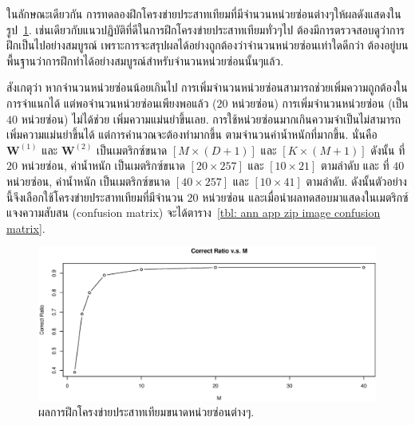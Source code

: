 ในลักษณะเดียวกัน การทดลองฝึกโครงข่ายประสาทเทียมที่มีจำนวนหน่วยซ่อนต่างๆให้ผลดังแสดงในรูป~\ref{fig: ann zip multiple Ms}.
เช่นเดียวกับแนวปฏิบัติที่ดีในการฝึกโครงข่ายประสาทเทียมทั่วๆไป ต้องมีการตรวจสอบดูว่าการฝึกเป็นไปอย่างสมบูรณ์ 
เพราะการจะสรุปผลได้อย่างถูกต้องว่าจำนวนหน่วยซ่อนเท่าใดดีกว่า 
ต้องอยู่บนพื้นฐานว่าการฝึกทำได้อย่างสมบูรณ์สำหรับจำนวนหน่วยซ่อนนั้นๆแล้ว.

สังเกตุว่า หากจำนวนหน่วยซ่อนน้อยเกินไป การเพิ่มจำนวนหน่วยซ่อนสามารถช่วยเพิ่มความถูกต้องในการจำแนกได้ แต่พอจำนวนหน่วยซ่อนเพียงพอแล้ว ($20$ หน่วยซ่อน) การเพิ่มจำนวนหน่วยซ่อน (เป็น $40$ หน่วยซ่อน) ไม่ได้ช่วย เพิ่มความแม่นยำขึ้นเลย.
การใช้หน่วยซ่อนมากเกินความจำเป็นไม่สามารถเพิ่มความแม่นยำขึ้นได้ แต่การคำนวณจะต้องทำมากขึ้น ตามจำนวนค่าน้ำหนักที่มากขึ้น.
นั่นคือ $\mathbf{W}^{(1)}$ และ $\mathbf{W}^{(2)}$ เป็นเมตริกซ์ขนาด $[M \times (D+1)]$ และ $[K \times (M+1)]$ 
ดังนั้น ที่ $20$ หน่วยซ่อน, ค่าน้ำหนัก เป็นเมตริกซ์ขนาด $[20 \times 257]$ และ $[10 \times 21]$ ตามลำดับ และ ที่ $40$ หน่วยซ่อน, ค่าน้ำหนัก เป็นเมตริกซ์ขนาด $[40 \times 257]$ และ $[10 \times 41]$ ตามลำดับ.
ดังนั้นตัวอย่างนี้จึงเลือกใช้โครงข่ายประสาทเทียมที่มีจำนวน $20$ หน่วยซ่อน 
และเมื่อนำผลทดสอบมาแสดงในเมตริกซ์แจงความสับสน (confusion matrix) จะได้ตาราง~\ref{tbl: ann app zip image confusion matrix}.

%
\begin{figure}
\begin{center}
\includegraphics[width=5.5in]{04ANNAppImg/zipComporingMs.eps}
\end{center}
\caption{ผลการฝึกโครงข่ายประสาทเทียมขนาดหน่วยซ่อนต่างๆ.}
\label{fig: ann zip multiple Ms}
\end{figure}
%

